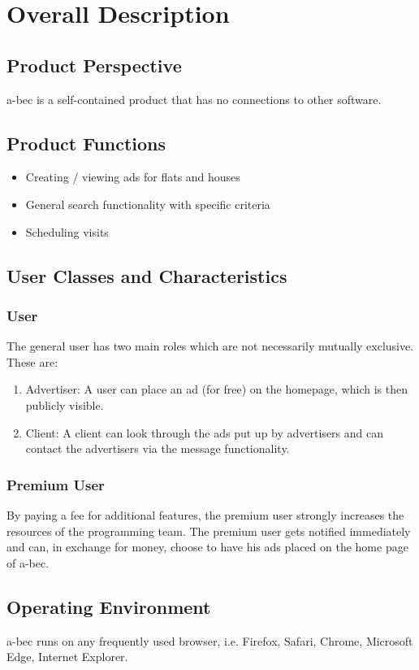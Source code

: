 \section{Overall Description}
\subsection{Product Perspective}
	a-bec is a self-contained product that has no connections to other software.	

\subsection{Product Functions}
\begin{itemize}
	\item Creating / viewing ads for flats and houses
	\item General search functionality with specific criteria
	\item Scheduling visits
	\end{itemize}

\subsection{User Classes and Characteristics}
	\subsubsection{User}
		The general user has two main roles which are not necessarily mutually exclusive. These are: \\
		\begin{enumerate}
		\item 		Advertiser: A user can place an ad (for free) on the homepage, which is then publicly visible.
		\item		Client: A client can look through the ads put up by advertisers and can contact the advertisers via the message functionality.
		\end{enumerate}
		
	\subsubsection{Premium User}
		By paying a fee for additional features, the premium user strongly increases the resources 
		of the programming team. The premium user gets notified immediately and can, in exchange for money, choose to have his ads placed on the home
		page of a-bec.
		
\subsection{Operating Environment}
	a-bec runs on any frequently used browser, i.e. Firefox, Safari, Chrome, Microsoft Edge, Internet Explorer.
	
